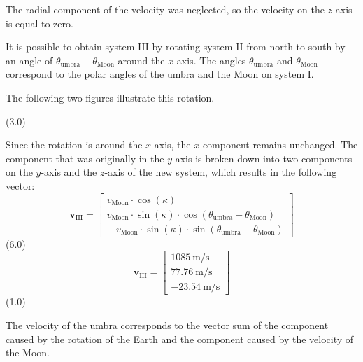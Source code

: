 \begin{description}
  The radial component of the velocity was neglected, so the velocity on the
  $z$-axis is equal to zero.

\item[(i)] It is possible to obtain system III by rotating system II from
  north to south by an angle of
  $\theta_{\mathrm{umbra}} - \theta_{\mathrm{Moon}}$ around the $x$-axis. The
  angles $\theta_{\mathrm{umbra}}$ and $\theta_{\mathrm{Moon}}$ correspond to
  the polar angles of the umbra and the Moon on system I.

  The following two figures illustrate this rotation.

  \hfill(3.0)

  Since the rotation is around the $x$-axis, the $x$ component remains
  unchanged. The component that was originally in the $y$-axis is broken down
  into two components on the $y$-axis and the $z$-axis of the new system,
  which results in the following vector:
  \[
    \mathbf{v}_{\mathrm{III}} =
    \begin{bmatrix}
      v_{\mathrm{Moon}} \cdot \cos(\kappa)\\
      v_{\mathrm{Moon}} \cdot \sin(\kappa) \cdot
        \cos(\theta_{\mathrm{umbra}} - \theta_{\mathrm{Moon}})\\
      -\,v_{\mathrm{Moon}} \cdot \sin(\kappa) \cdot
        \sin(\theta_{\mathrm{umbra}} - \theta_{\mathrm{Moon}})
    \end{bmatrix}
  \]
  \hfill(6.0)
  \[
    \mathbf{v}_{\mathrm{III}} =
    \begin{bmatrix}
      1085\ \mathrm{m/s}\\
      77.76\ \mathrm{m/s}\\
      -23.54\ \mathrm{m/s}
    \end{bmatrix}
  \]
  \hfill(1.0)

\item[(j)] The velocity of the umbra corresponds to the vector sum of the
  component caused by the rotation of the Earth and the component caused by
  the velocity of the Moon.


\end{description}

